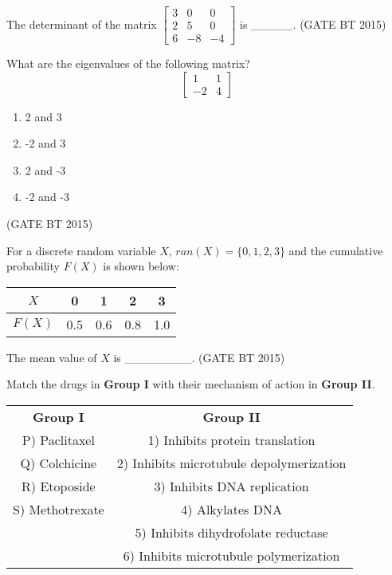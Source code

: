     \item The determinant of the matrix 
    $
    \begin{bmatrix}
    3 & 0 & 0 \\
    2 & 5 & 0 \\
    6 & -8 & -4
    \end{bmatrix}
    $
    is \_\_\_\_\_.
    \hfill (GATE BT 2015)

\item What are the eigenvalues of the following matrix?
\[
\begin{bmatrix}
1 & 1 \\
-2 & 4
\end{bmatrix}
\]

\begin{multicols}{4}
\begin{enumerate}
    \item 2 and 3
    \item -2 and 3
    \item 2 and -3
    \item -2 and -3
\end{enumerate}
\end{multicols}\hfill (GATE BT 2015)

\item For a discrete random variable $X$, $ran(X)=\{0,1,2,3\}$ and the cumulative probability $F(X)$ is shown below:

\begin{table}[H]
\centering
\begin{tabular}{|c|c|c|c|c|}
\hline
$X$ & 0 & 1 & 2 & 3 \\
\hline
$F(X)$ & 0.5 & 0.6 & 0.8 & 1.0 \\
\hline
\end{tabular}
\end{table}

The mean value of $X$ is \_\_\_\_\_\_\_\_.
\hfill (GATE BT 2015)



\item Match the drugs in \textbf{Group I} with their mechanism of action in \textbf{Group II}.

\begin{table}[H]
\begin{tabular}{cc}
\textbf{Group I} & \textbf{Group II}  \\
P)  Paclitaxel      & 1)  Inhibits protein translation \\
Q)  Colchicine      & 2) Inhibits microtubule depolymerization \\
R)  Etoposide       & 3)  Inhibits DNA replication \\
S)  Methotrexate    & 4)  Alkylates DNA \\
              & 5) Inhibits dihydrofolate reductase \\
               & 6)  Inhibits microtubule polymerization \\

\end{tabular}
\end{table}


